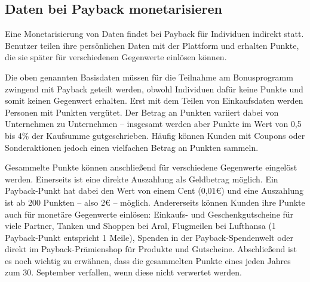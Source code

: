 \subsection{Daten bei Payback monetarisieren}
Eine Monetarisierung von Daten findet bei Payback für Individuen indirekt statt. Benutzer teilen ihre persönlichen Daten mit der Plattform und erhalten Punkte, die sie später für verschiedenen Gegenwerte einlösen können. \newline

\noindent Die oben genannten Basisdaten müssen für die Teilnahme am Bonusprogramm zwingend mit Payback geteilt werden, obwohl Individuen dafür keine Punkte und somit keinen Gegenwert erhalten. Erst mit dem Teilen von Einkaufsdaten werden Personen mit Punkten vergütet. Der Betrag an Punkten variiert dabei von Unternehmen zu Unternehmen -- insgesamt werden aber Punkte im Wert von 0,5 bis 4\% der Kaufsumme gutgeschrieben. Häufig können Kunden mit Coupons oder Sonderaktionen jedoch einen vielfachen Betrag an Punkten sammeln. \newline

\noindent Gesammelte Punkte können anschließend für verschiedene Gegenwerte eingelöst werden. Einerseits ist eine direkte Auszahlung als Geldbetrag möglich. Ein Payback-Punkt hat dabei den Wert von einem Cent (0,01€) und eine Auszahlung ist ab 200 Punkten -- also 2€ -- möglich. \cite{Payback_Teilnahme} Andererseits können Kunden ihre Punkte auch für monetäre Gegenwerte einlösen: Einkaufs- und Geschenkgutscheine für viele Partner, Tanken und Shoppen bei Aral, Flugmeilen bei Lufthansa (1 Payback-Punkt entspricht 1 Meile), Spenden in der Payback-Spendenwelt oder direkt im Payback-Prämienshop für Produkte und Gutscheine. \cite{Payback_Einlösen} Abschließend ist es noch wichtig zu erwähnen, dass die gesammelten Punkte eines jeden Jahres zum 30. September verfallen, wenn diese nicht verwertet werden. \cite{Payback_Teilnahme}
